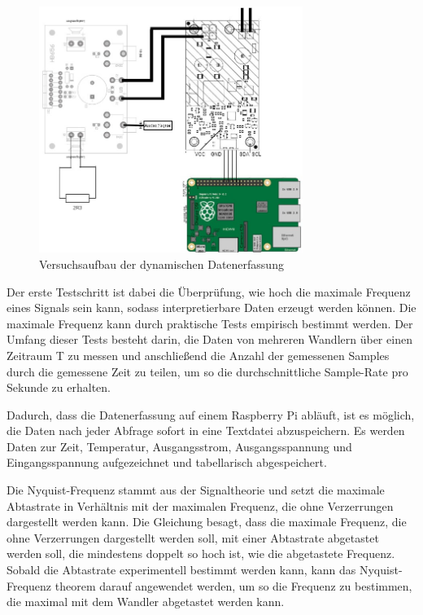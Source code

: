 \begin{figure}[H]
    \centering
    \includegraphics[height= 8cm, width = \textwidth]{Pictures/Dyn_Schaltung.jpg}
    \caption{Versuchsaufbau der dynamischen Datenerfassung}
\end{figure}

Der erste Testschritt ist dabei die Überprüfung, wie hoch die maximale Frequenz eines Signals sein kann, sodass interpretierbare Daten erzeugt werden können. Die maximale Frequenz kann durch praktische Tests empirisch bestimmt werden. Der Umfang dieser Tests besteht darin, die Daten von mehreren Wandlern über einen Zeitraum T zu messen und anschließend die Anzahl der gemessenen Samples durch die gemessene Zeit zu teilen, um so die durchschnittliche Sample-Rate pro Sekunde zu erhalten. 

Dadurch, dass die Datenerfassung auf einem Raspberry Pi abläuft, ist es möglich, die Daten nach jeder Abfrage sofort in eine Textdatei abzuspeichern. Es werden Daten zur Zeit, Temperatur, Ausgangsstrom, Ausgangsspannung und Eingangsspannung aufgezeichnet und tabellarisch abgespeichert.

Die Nyquist-Frequenz stammt aus der Signaltheorie und setzt die maximale Abtastrate in Verhältnis mit der maximalen Frequenz, die ohne Verzerrungen dargestellt werden kann. Die Gleichung besagt, dass die maximale Frequenz, die ohne Verzerrungen dargestellt werden soll, mit einer Abtastrate abgetastet werden soll, die mindestens doppelt so hoch ist, wie die abgetastete Frequenz. Sobald die Abtastrate experimentell bestimmt werden kann, kann das Nyquist-Frequenz theorem darauf angewendet werden, um so die Frequenz zu bestimmen, die maximal mit dem Wandler abgetastet werden kann. 


